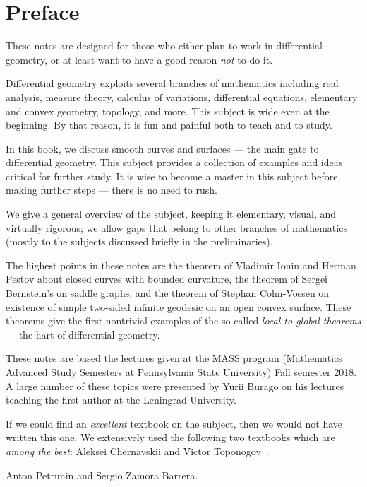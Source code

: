 
\chapter*{Preface}

These notes are designed for those who either plan to work in differential geometry,
or at least want to have a good reason \emph{not} to do it.

Differential geometry exploits several branches of mathematics including 
real analysis, 
measure theory,
calculus of variations,
differential equations,
elementary and convex geometry,
topology, and more.
This subject is wide even at the beginning. 
By that reason, it is fun and painful both to teach and to study.

In this book, we discuss smooth curves and surfaces --- the main gate to differential geometry.
This subject provides a collection of examples and ideas critical for further study.
It is wise to become a master in this subject before making further steps --- there is no need to rush.

We give a general overview of the subject, keeping it elementary, visual, and virtually rigorous; we allow gaps that belong to other branches of mathematics (mostly to the subjects discussed briefly in the preliminaries).

The highest points in these notes are
the theorem of Vladimir Ionin and Herman Pestov about closed curves with bounded curvature,
the theorem of Sergei Bernstein's on saddle graphs,
and the theorem of Stephan Cohn-Vossen on existence of simple two-sided infinite geodesic on an open convex surface.
These theorems give the first nontrivial examples of the so called {}\emph{local to global theorems} --- the hart of differential geometry.

These notes are based the lectures given at the MASS program (Mathematics Advanced Study Semesters at Pennsylvania State University) Fall semester 2018.
A large number of these topics were presented by Yurii Burago on his lectures teaching the first author at the Leningrad University.

If we could find an \emph{excellent} textbook on the subject, then we would not have written this one.
We extensively used the following two textbooks which are \emph{among the best}: Aleksei Chernavskii \cite{chernavsky} and Victor Toponogov~\cite{toponogov-book}.

\begin{flushright}
Anton Petrunin and
Sergio Zamora Barrera.
\end{flushright}



\newpage
\tableofcontents
